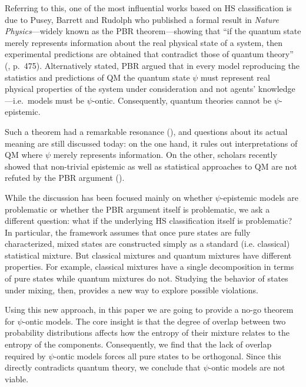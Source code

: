 \documentclass[10pt,twocolumn, nofootinbib]{revtex4-2}
\begin{document}
Referring to this, one of the most influential works based on HS classification is due to Pusey, Barrett and Rudolph who published a formal result in \emph{Nature Physics}---widely known as the PBR theorem---showing that ``if the quantum state merely represents information about the real physical state of a system, then experimental predictions are obtained that contradict those of quantum theory'' (\cite{PBR:2012}, p.\ 475). Alternatively stated, PBR argued that in every model reproducing the statistics and predictions of QM the quantum state $\psi$ must represent real physical properties of the system under consideration and not agents' knowledge---i.e.\ models must be $\psi$-ontic. Consequently, quantum theories cannot be $\psi$-epistemic. 

Such a theorem had a remarkable resonance (\cite{Leifer:2014, Leifer:2014b, Lewis:2012, Renner:2012, Colbeck:2017, Hardy:2013, Maroney:2014, Patra:2013, Mansfield:2016, Schlosshauer:2012, Schlosshauer:2013, Schlosshauer:2014, Aaronson:2013}), and questions about its actual meaning are still discussed today: on the one hand, it rules out interpretations of QM where $\psi$ merely represents information. On the other, scholars recently showed that non-trivial epistemic as well as statistical approaches to QM are not refuted by the PBR argument (\cite{Ben:2017, Rizzi:2018, Oldofredi:2021, DeBrota:2019}).

While the discussion has been focused mainly on whether $\psi$-epistemic models are problematic or whether the PBR argument itself is problematic, we ask a different question: what if the underlying HS classification itself is problematic? In particular, the framework assumes that once pure states are fully characterized, mixed states are constructed simply as a standard (i.e. classical) statistical mixture. But classical mixtures and quantum mixtures have different properties. For example, classical mixtures have a single decomposition in terms of pure states while quantum mixtures do not. Studying the behavior of states under mixing, then, provides a new way to explore possible violations.

Using this new approach, in this paper we are going to provide a no-go theorem for $\psi$-ontic models. The core insight is that the degree of overlap between two probability distributions affects how the entropy of their mixture relates to the entropy of the components. Consequently, we find that the lack of overlap required by $\psi$-ontic models forces all pure states to be orthogonal. Since this directly contradicts quantum theory, we conclude that $\psi$-ontic models are not viable.
\end{document}
